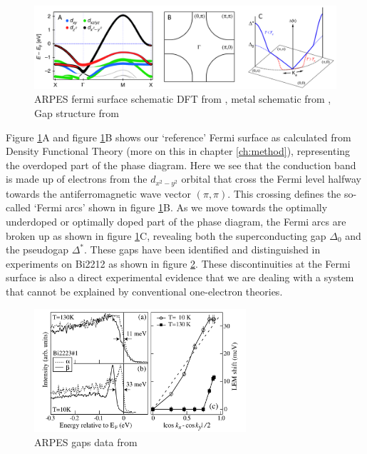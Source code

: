 \begin{figure}
    \centering
    \includegraphics[width=\textwidth]{fig/intro/arpes_fermisurface.png}
    \caption[ARPES fermi surface schematic]{ARPES fermi surface schematic DFT from \cite{Matt2018}, metal schematic from \cite{Damascelli2003}, Gap structure from \cite{Yoshida2011}}
    \label{fig:intro_arpes}
\end{figure}

Figure \ref{fig:intro_arpes}A and figure \ref{fig:intro_arpes}B shows our `reference' Fermi surface as calculated from Density Functional Theory (more on this in chapter \ref{ch:method}), representing the overdoped part of the phase diagram. Here we see that the conduction band is made up of electrons from the $d_{x^2-y^2}$ orbital that cross the Fermi level halfway towards the antiferromagnetic wave vector $(\pi,\pi)$. This crossing defines the so-called `Fermi arcs' shown in figure \ref{fig:intro_arpes}B. As we move towards the optimally underdoped or optimally doped part of the phase diagram, the Fermi arcs are broken up as shown in figure \ref{fig:intro_arpes}C, revealing both the superconducting gap $\Delta_0$ and the pseudogap $\Delta^*$. These gaps have been identified and distinguished in experiments on Bi2212 as shown in figure \ref{fig:intro_arpes_feng}. These discontinuities at the Fermi surface is also a direct experimental evidence that we are dealing with a system that cannot be explained by conventional one-electron theories.

\begin{figure}[]
    \centering
    \includegraphics[width=0.7\textwidth]{fig/intro/arpes_feng.png}
    \caption[ARPES gaps data]{ARPES gaps data from \cite{Feng2002}}
    \label{fig:intro_arpes_feng}
\end{figure}

